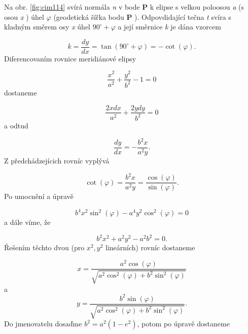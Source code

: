 \documentclass[11pt,a4paper]{article}
\begin{document}
Na obr. \ref{fig:cim114} svírá normála \textit{n} v bode \textbf{P} k elipse s 
velkou poloosou \textit{a} (s osou \textit{x} ) úhel $\varphi$ (geodetická šířka 
bodu \textbf{P} ). Odpovdidající tečna \textit{t} svíra s kladným směrem osy 
\textit{x} úhel $90^{\circ} + \varphi$ a její směrnice \textit{k} je dána vzorcem

\begin{equation}
k = \dfrac{dy}{dx} = \tan{\left(90^{\circ} + \varphi\right)} = -\cot{\left(\varphi\right)}.
\end{equation}
Diferencovaním rovnice meridiánové elipsy

\begin{equation}
\dfrac{x^{2}}{a^{2}} + \dfrac{y^{2}}{b^{2}} -1 = 0
\end{equation}
dostaneme

\begin{equation}
\dfrac{2xdx}{a^{2}} + \dfrac{2ydy}{b^{2}} = 0
\end{equation}
a odtud

\begin{equation}
\dfrac{dy}{dx} = - \dfrac{b^{2}x}{a^{2}y}.
\end{equation}
Z předchádzejícich rovníc vyplývá

\begin{equation}
\cot{\left(\varphi\right)} = \dfrac{b^{2}x}{a^{2}y} = \dfrac{\cos{\left(\varphi\right)}}{\sin{\left(\varphi\right)}}.
\end{equation}
Po umocnění a úpravě

\begin{equation}
b^{4}x^{2}\sin^{2}{\left(\varphi\right)} - a^{4}y^{2}\cos^{2}{\left(\varphi\right)} = 0
\end{equation}
a dále víme, že

\begin{equation}
b^{2}x^{2} + a^{2}y^{2} - a^{2}b^{2} = 0.
\end{equation}
Řešením těchto dvou (pro $x^{2}, y^{2}$ lineárních) rovníc dostaneme

\begin{equation}
x =\dfrac{a^{2}\cos{\left(\varphi\right)}}{\sqrt{a^{2}\cos^{2}{\left(\varphi\right)} + b^{2}\sin^{2}{\left(\varphi\right)}}}
\end{equation}
a
\begin{equation}
y =\dfrac{b^{2}\sin{\left(\varphi\right)}}{\sqrt{a^{2}\cos^{2}{\left(\varphi\right)} + b^{2}\sin^{2}{\left(\varphi\right)}}}.
\end{equation}
Do jmenovatelu dosaďme $b^{2} = a^{2}\left(1-e^{2}\right)$, potom po úpravě dostaneme
\end{document}
